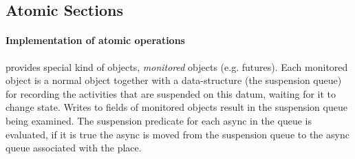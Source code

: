 \subsection{Atomic Sections}

\paragraph{Implementation of atomic operations}
{}\Xtenlib{} provides special kind of objects, {\em monitored} objects
(e.g.{} futures). Each monitored object is a normal \Xten{} object
together with a data-structure (the suspension queue) for recording
the activities that are suspended on this datum, waiting for it to
change state. Writes to fields of monitored objects result in the
suspension queue being examined. The suspension predicate for each
async in the queue is evaluated, if it is true the async is moved from
the suspension queue to the async queue associated with the place.
